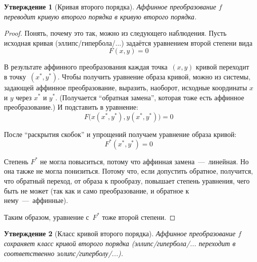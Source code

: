 \documentclass[a4paper,12pt]{article}
\newtheorem{proposition}{Утверждение}[section]
\begin{document}
  
  \begin{proposition}[Кривая второго порядка]
    Аффинное преобразование $f$ переводит кривую второго порядка в кривую второго порядка.
  \end{proposition}
  
  \begin{proof}
    Понять, почему это так, можно из следующего наблюдения.
    Пусть исходная кривая (эллипс/гипербола/...) задаётся уравнением второй степени вида
    \[
      F(x, y) = 0
    \]
    
    В результате аффинного преобразования каждая точка~$(x, y)$ кривой переходит в точку~$(x^*, y^*)$.
    Чтобы получить уравнение образа кривой, можно из системы, задающей аффинное преобразование, выразить, наоборот, исходные координаты $x$ и $y$ через $x^*$ и $y^*$.
    (Получается ``обратная замена'', которая тоже есть аффинное преобразование.)
    И подставить в уравнение:
    \[
      F\bigl(x(x^*, y^*), y(x^*, y^*)\bigr) = 0
    \]
    
    После ``раскрытия скобок'' и упрощений получаем уравнение образа кривой:
    \[
      F^*(x^*, y^*) = 0
    \]
    
    Степень $F^*$ не могла повыситься, потому что аффинная замена~---~линейная.
    Но она также не могла понизиться.
    Потому что, если допустить обратное, получится, что обратный переход, от образа к прообразу, повышает степень уравнения, чего быть не может (так как и само преобразование, и обратное к нему~---~аффинные).
    
    Таким образом, уравнение с~$F^*$ тоже второй степени.
  \end{proof}
  
  
  \begin{proposition}[Класс кривой второго порядка]
    Аффинное преобразование $f$ сохраняет класс кривой второго порядка (эллипс/гипербола/... переходит в соответственно эллипс/гиперболу/...).
  \end{proposition}
  
\end{document}
